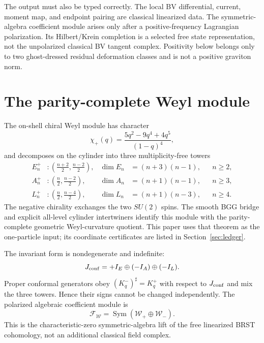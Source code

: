 \documentclass[11pt]{article}
\theoremstyle{remark}
\newcommand{\W}{\mathcal W}
\newcommand{\F}{\mathcal F}
\begin{document}
The output must also be typed correctly.  The local BV differential,
current, moment map, and endpoint pairing are classical linearized data.
The symmetric-algebra coefficient module arises only after a
positive-frequency Lagrangian polarization.  Its Hilbert/Krein completion is
a selected free state representation, not the unpolarized classical BV
tangent complex.  Positivity below belongs only to two ghost-dressed
residual deformation classes and is not a positive graviton norm.

\section{The parity-complete Weyl module}

The on-shell chiral Weyl module has character
\begin{equation}\label{eq:character}
 \chi_+(q)=\frac{5q^2-9q^4+4q^5}{(1-q)^4},
\end{equation}
and decomposes on the cylinder into three multiplicity-free towers
\begin{align}
 E_n^+&:\left(\frac{n+2}{2},\frac{n-2}{2}\right),
 &\dim E_n&=(n+3)(n-1), &&n\ge2,\nonumber\\
 A_n^+&:\left(\frac n2,\frac{n-2}{2}\right),
 &\dim A_n&=(n+1)(n-1), &&n\ge3,\label{eq:EAL}\\
 L_n^+&:\left(\frac n2,\frac{n-4}{2}\right),
 &\dim L_n&=(n+1)(n-3), &&n\ge4.\nonumber
\end{align}
The negative chirality exchanges the two $SU(2)$ spins.  The smooth BGG
bridge and explicit all-level cylinder intertwiners identify this module
with the parity-complete geometric Weyl-curvature quotient.  This paper uses
that theorem as the one-particle input; its coordinate certificates are
listed in Section~\ref{sec:ledger}.

The invariant form is nondegenerate and indefinite:
\begin{equation}\label{eq:krein-one}
 J_{\rm conf}=+I_E\oplus(-I_A)\oplus(-I_L).
\end{equation}
Proper conformal generators obey $(K^-_q)^\sharp=K^+_q$ with respect to
$J_{\rm conf}$ and mix the three towers.  Hence their signs cannot be
changed independently.  The polarized algebraic coefficient module is
\begin{equation}\label{eq:fock-alg}
 \F_{\W}=\operatorname{Sym}(\W_+\oplus\W_-).
\end{equation}
This is the characteristic-zero symmetric-algebra lift of the free
linearized BRST cohomology, not an additional classical field complex.
\end{document}
